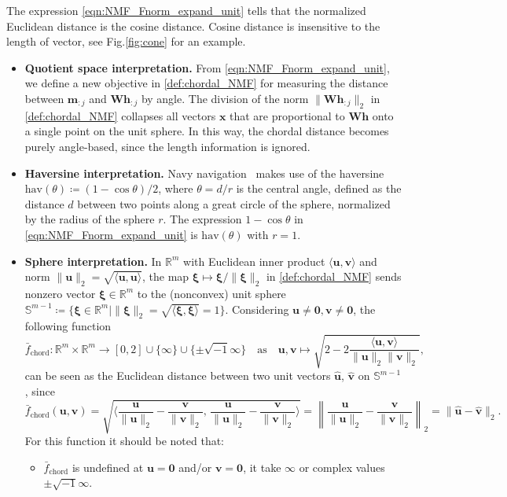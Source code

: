 \documentclass[sn-mathphys-num]{sn-jnl}
\def\zeros           {\bm{0}}            %
\def\IR  {\mathbb{R}} 	    %
\def\IRm {\IR^{m}} 			%
\def\IS {\mathbb{S}} 		%
\def\W {\bm{W}}
\def\h {\bm{h}}
\def\m {\bm{m}}
\def\u {\bm{u}}
\def\v {\bm{v}}
\def\x {\bm{x}}
\def\bxi      {\boldsymbol{\xi}}
\begin{document}
The expression \eqref{eqn:NMF_Fnorm_expand_unit} tells that the normalized Euclidean distance is the cosine distance.
Cosine distance is insensitive to the length of vector, see Fig.\ref{fig:cone} for an example.
\begin{itemize}
\item \textbf{Quotient space interpretation.}
From \eqref{eqn:NMF_Fnorm_expand_unit}, we define a new objective in \eqref{def:chordal_NMF} for measuring the distance between $\m_{:j}$ and $\W\h_{:j}$ by angle.
The division of the norm $\| \W \h_{:j}\|_2$ in \eqref{def:chordal_NMF} collapses all vectors  $\x$ that are proportional to $\W\h$ onto a single point on the unit sphere. 
In this way, the chordal distance becomes purely angle-based, since the length information is ignored.

\item \textbf{Haversine interpretation.}
Navy navigation~\cite{robusto1957cosine} makes use of the haversine $\textrm{hav}(\theta) \coloneqq (1-\cos \theta)/2$, where $\theta = d/r$ is the central angle, defined as the distance $d$ between two points along a great circle of the sphere, normalized by the radius of the sphere $r$.
The expression $1-\cos\theta$ in \eqref{eqn:NMF_Fnorm_expand_unit} is $\textrm{hav}(\theta)$ with $r=1$.

\item \textbf{Sphere interpretation.}
In $\IRm$ with Euclidean inner product $\langle \u, \v \rangle$ and norm $\| \u \|_2 = \sqrt{\langle \u, \u \rangle}$, the map $\bxi \mapsto \bxi / \| \bxi \|_2$ in \eqref{def:chordal_NMF}
sends nonzero vector $\bxi \in \IRm$ to the (nonconvex) unit sphere 
$
\IS^{m-1} 
\coloneqq\{
\bxi \in \IRm | \| \bxi \|_2 = \sqrt{\langle \bxi, \bxi \rangle}  = 1
\}
$.
Considering $\u \neq \zeros, \v \neq \zeros$, the following function
\[\bar{f}_{\text{chord}} :
\IRm \times \IRm \rightarrow  [0, 2] \cup \{\infty\} \cup  \{\pm \sqrt{-1}\infty\} \quad\text{as}\quad
\u,\v \mapsto 
\sqrt{
2 - 2   \dfrac{\langle \u , \v \rangle}{\| \u \|_2 \| \v \|_2} 
},
\]
can be seen as the Euclidean distance between two unit vectors $\hat{\u}$, $\hat{\v}$ on $\IS^{m-1}$, since
\[
\bar{f}_{\text{chord}}(\u,\v) 
=
\sqrt{
\Big\langle
\dfrac{\u}{\|\u\|_2}-\dfrac{\v}{\|\v\|_2}, \,
\dfrac{\u}{\|\u\|_2}-\dfrac{\v}{\|\v\|_2} 
\Big\rangle
}
=
\left\|\frac{\u}{\|\u\|_2}-\frac{\v}{\|\v\|_2}\right\|_2
=
\|\hat{\u}  - \hat{\v} \|_2.
\]
For this function it should be noted that:
\begin{itemize}
\item $\bar{f}_{\text{chord}}$ is undefined at $\u = \zeros$ and/or $\v = \zeros$, it take $\infty$ or complex values $\pm \sqrt{-1}\infty$.


\end{itemize}
\end{itemize}
\end{document}
